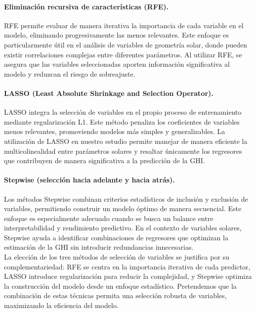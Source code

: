 \paragraph{Eliminación recursiva de características (RFE).} RFE permite evaluar de manera iterativa la importancia de cada variable en el modelo, eliminando progresivamente las menos relevantes. Este enfoque es particularmente útil en el análisis de variables de geometría solar, donde pueden existir correlaciones complejas entre diferentes parámetros. Al utilizar RFE, se asegura que las variables seleccionadas aporten información significativa al modelo y reduzcan el riesgo de sobreajuste.  

\paragraph{LASSO (Least Absolute Shrinkage and Selection Operator).} LASSO integra la selección de variables en el propio proceso de entrenamiento mediante regularización L1. Este método penaliza los coeficientes de variables menos relevantes, promoviendo modelos más simples y generalizables. La utilización de LASSO en nuestro estudio permite manejar de manera eficiente la multicolinealidad entre parámetros solares y resaltar únicamente los regresores que contribuyen de manera significativa a la predicción de la GHI.  

\paragraph{Stepwise (selección hacia adelante y hacia atrás).} Los métodos Stepwise combinan criterios estadísticos de inclusión y exclusión de variables, permitiendo construir un modelo óptimo de manera secuencial. Este enfoque es especialmente adecuado cuando se busca un balance entre interpretabilidad y rendimiento predictivo. En el contexto de variables solares, Stepwise ayuda a identificar combinaciones de regresores que optimizan la estimación de la GHI sin introducir redundancias innecesarias. \\ 


La elección de los tres métodos de selección de variables se justifica por su complementariedad: RFE se centra en la importancia iterativa de cada predictor, LASSO introduce regularización para reducir la complejidad, y Stepwise optimiza la construcción del modelo desde un enfoque estadístico. Pretendemos que la combinación de estas técnicas permita una selección robusta de variables, maximizando la eficiencia del modelo.\\

